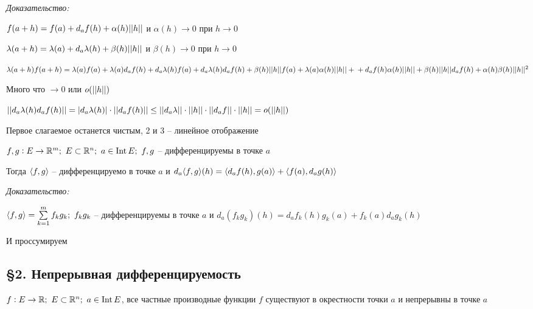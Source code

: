 \documentclass[12pt]{article}
\begin{document}
\textit{Доказательство:}

$f(a + h) = f(a) + d_a f(h) + \alpha(h)|| h ||$ и $\alpha(h) \to 0$ при $h \to 0$

$\lambda(a + h) = \lambda(a) + d_a\lambda(h) + \beta(h)|| h ||$ и $\beta(h) \to 0$ при $h \to 0$

\newpage

$\lambda(a + h)f(a + h) = \lambda(a)f(a) + \lambda(a)d_af(h) + d_a\lambda(h)f(a) + d_a\lambda(h)d_af(h) + \beta(h)|| h ||f(a) + \lambda(a)\alpha(h)|| h || + \\ + d_af(h)\alpha(h)|| h || + \beta(h)|| h ||d_af(h) + \alpha(h)\beta(h)|| h ||^2$

Много что $\to 0$ или $o(|| h ||)$

$|| d_a\lambda(h)d_af(h) || = |d_a\lambda(h)| \cdot || d_af(h) || \leq || d_a\lambda || \cdot || h || \cdot || d_af || \cdot || h || = o(|| h ||)$

Первое слагаемое останется чистым, 2 и 3 -- линейное отображение

\begin{theo}{}
    $f, g : E \to \mathbb R^m;\ E \subset \mathbb R^n;\ a \in \operatorname{Int} E;\ f, g$ -- дифференцируемы в точке $a$

    Тогда $\langle f, g \rangle$ -- дифференцируемо в точке $a$ и $d_a\langle f, g \rangle(h) = \langle d_a f(h), g(a) \rangle + \langle f(a), d_a g(h) \rangle$
\end{theo}

\textit{Доказательство:}

$\q{f, g} = \sum\limits_{k = 1}^m f_k g_k;\ f_kg_k$ -- дифференцируемы в точке $a$ и $d_a(f_kg_k)(h) = d_a f_k(h)g_k(a) + f_k(a)d_a g_k(h)$

И проссумируем

\subsection{\S 2. Непрерывная дифференцируемость}

\begin{theo}{}
    $f : E \to \mathbb R;\ E \subset \mathbb R^n;\ a \in \operatorname{Int} E$, все частные производные функции $f$ существуют в окрестности точки $a$ и непрерывны в точке $a$
\end{theo}
\end{document}
